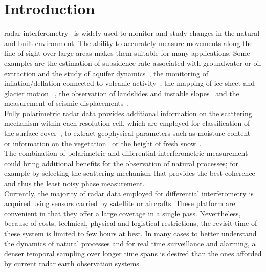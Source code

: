 \section{Introduction}
 radar interferometry~\cite{Gabriel1989, Massonnet1993,Rosen2000,Bamler1999} is widely used  to monitor and study changes in the natural and built environment. The ability to accurately measure movements along the line of sight over large areas makes them suitable for many  applications. Some examples are the estimation of subsidence rate associated with groundwater or oil extraction and the study of aquifer dynamics~\cite{Galloway1998, Strozzi2001,Galloway2007}, the monitoring of inflation/deflation connected to volcanic activity~\cite{Massonnet1995}, the mapping of ice sheet and glacier motion~\cite{Goldstein1993,Mohr1998} , the observation of landslides and instable slopes~\cite{Carnec1996,Catani2005} and the measurement of seismic displacements~\cite{Massonnet1993a,Zebker1994}.\\
Fully polarimetric radar data provides additional information on the scattering mechanism within each resolution cell, which are employed for classification of the surface cover~\cite{Cloude1997, Lee1999}, to extract geophysical parameters such as moisture content~\cite{Hajnsek2003} or information on the vegetation~\cite{Ulaby1987} or the height of fresh snow~\cite{Leinss2014}.\\
The combination of polarimetric and differential interferometric measurement could bring additional benefits for the observation of natural processes; for example by selecting the scattering mechanism that provides the best coherence and thus the least noisy phase measurement\cite{Pipia2009a, Iglesias2014b}.\\
Currently, the majority of radar data employed for differential interferometry is acquired using sensors carried by satellite or aircrafts. These platform are convenient in that they offer a large coverage in a single pass. Nevertheless, because of costs, technical, physical and logistical restrictions, the revisit time of these system is limited to few hours at best. 
In many cases to better understand the dynamics of natural processes and for real time surveillance and alarming, a denser temporal sampling over longer time spans is desired than the ones afforded by current radar earth observation systems.
